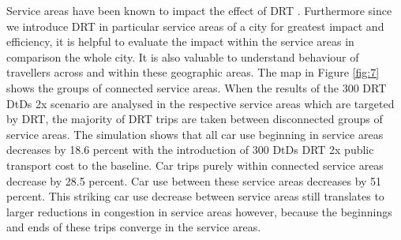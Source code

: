 \documentclass[a4paper]{article}
\begin{document}
    
    



Service areas have been known to impact the effect of DRT \citep{kaddoura2020impact, schluter2021impact}. Furthermore since we introduce DRT in particular service areas of a city for greatest impact and efficiency, it is helpful to evaluate the impact within the service areas in comparison the whole city. It is also valuable to understand behaviour of travellers across and within these geographic areas.
The map in Figure \ref{fig:7} shows the groups of connected service areas.
When the results of the 300 DRT DtDs 2x scenario are analysed in the respective service areas which are targeted by DRT, the majority of DRT trips are taken between disconnected groups of service areas. 
The simulation shows that all car use beginning in service areas decreases by 18.6 percent with the introduction of 300 DtDs DRT 2x public transport cost to the baseline. Car trips purely within connected service areas decrease by 28.5 percent. Car use between these service areas decreases by 51 percent. This striking car use decrease between service areas still translates to larger reductions in congestion in service areas however, because the beginnings and ends of these trips converge in the service areas.
\\
\end{document}

